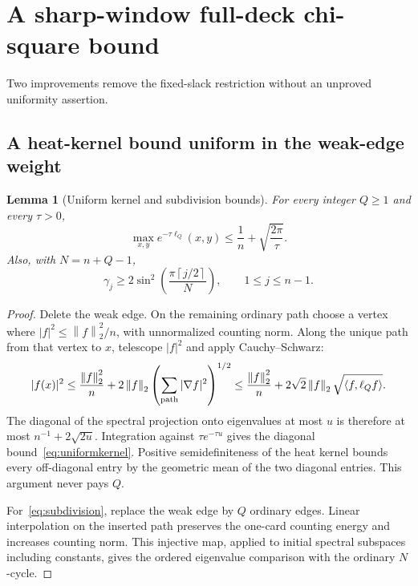 \documentclass[11pt]{article}
\newtheorem{lemma}[theorem]{Lemma}
\theoremstyle{remark}
\newcommand{\norm}[1]{\left\lVert #1\right\rVert}
\newcommand{\ip}[2]{\left\langle #1,#2\right\rangle}
\newcommand{\ceil}[1]{\left\lceil #1\right\rceil}
\begin{document}
\section{A sharp-window full-deck chi-square bound}\label{sec:sharpL2}
Two improvements remove the fixed-slack restriction without an unproved uniformity assertion.

\subsection{A heat-kernel bound uniform in the weak-edge weight}
\begin{lemma}[Uniform kernel and subdivision bounds]\label{lem:uniformkernel}
For every integer $Q\geq1$ and every $\tau>0$,
\begin{equation}\label{eq:uniformkernel}
 \max_{x,y}e^{-\tau\ell_Q}(x,y)\leq\frac1n+\sqrt{\frac{2\pi}{\tau}}.
\end{equation}
Also, with $N=n+Q-1$,
\begin{equation}\label{eq:subdivision}
 \gamma_j\geq2\sin^2\!\left(\frac{\pi\ceil{j/2}}N\right),
 \qquad 1\leq j\leq n-1.
\end{equation}
\end{lemma}
\begin{proof}
Delete the weak edge. On the remaining ordinary path choose a vertex where $|f|^2\leq\norm f_2^2/n$, with unnormalized counting norm. Along the unique path from that vertex to $x$, telescope $|f|^2$ and apply Cauchy--Schwarz:
\[
 |f(x)|^2\leq\frac{\norm f_2^2}{n}
       +2\norm f_2\left(\sum_{\rm path}|\nabla f|^2\right)^{1/2}
 \leq\frac{\norm f_2^2}{n}+2\sqrt2\norm f_2\sqrt{\ip f{\ell_Qf}}.
\]
The diagonal of the spectral projection onto eigenvalues at most $u$ is therefore at most $n^{-1}+2\sqrt{2u}$. Integration against $\tau e^{-\tau u}$ gives the diagonal bound~\eqref{eq:uniformkernel}. Positive semidefiniteness of the heat kernel bounds every off-diagonal entry by the geometric mean of the two diagonal entries. This argument never pays $Q$.

For~\eqref{eq:subdivision}, replace the weak edge by $Q$ ordinary edges. Linear interpolation on the inserted path preserves the one-card counting energy and increases counting norm. This injective map, applied to initial spectral subspaces including constants, gives the ordered eigenvalue comparison with the ordinary $N$-cycle.
\end{proof}
\end{document}
